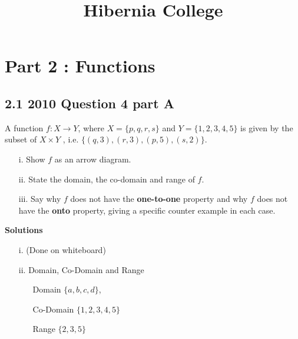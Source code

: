 \documentclass[12 pt]{article}
\title{Hibernia College}
\author{}
\begin{document}
\maketitle



\newpage
\section*{Part 2 : Functions}







\subsection*{2.1 2010 Question 4 part A}

A function $f : X \rightarrow Y$, where $X = \{p,q,r,s\}$ and $Y=\{1,2,3,4,5\}$ is given by the subset of $ X \times Y$ ,
i.e. $\{(q,3),(r,3),(p,5),(s,2)\}$.

\begin{itemize}
\item[i.] Show $f$ as an arrow diagram.
\item[ii.] State the domain, the co-domain and range of $f$.
\item[iii.] Say why $f$ does not have the \textbf{one-to-one} property and why $f$ does not have the \textbf{onto} property, giving a specific counter example in each case.
\end{itemize}

\textbf{Solutions}
\begin{itemize}
\item[i.] (Done on whiteboard)
\item[ii.] Domain, Co-Domain and Range
\begin{itemize}
\item[Domain] $\{a,b,c,d\}$,
\item[Co-Domain] $\{1,2,3,4,5\}$
\item[Range] $\{2,3,5\}$
\end{itemize}
\end{itemize}
\end{document}
